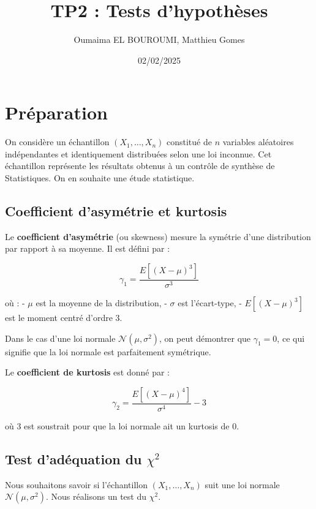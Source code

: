 \documentclass{article}
\title{TP2 : Tests d’hypothèses}
\author{Oumaima EL BOUROUMI, Matthieu Gomes}
\date{02/02/2025}
\begin{document}
\maketitle



\section{Préparation}

On considère un échantillon \( (X_1, \dots, X_n) \) constitué de \( n \) variables aléatoires indépendantes et identiquement distribuées selon une loi inconnue. Cet échantillon représente les résultats obtenus à un contrôle de synthèse de Statistiques. On en souhaite une étude statistique.

\subsection{Coefficient d’asymétrie et kurtosis}

Le \textbf{coefficient d’asymétrie} (ou skewness) mesure la symétrie d’une distribution par rapport à sa moyenne. Il est défini par :

\[
\gamma_1 = \frac{E[(X - \mu)^3]}{\sigma^3}
\]

où :
- \( \mu \) est la moyenne de la distribution,
- \( \sigma \) est l’écart-type,
- \( E[(X - \mu)^3] \) est le moment centré d’ordre 3.

Dans le cas d’une loi normale \( \mathcal{N}(\mu, \sigma^2) \), on peut démontrer que \( \gamma_1 = 0 \), ce qui signifie que la loi normale est parfaitement symétrique.

Le \textbf{coefficient de kurtosis} est donné par :

\[
\gamma_2 = \frac{E[(X - \mu)^4]}{\sigma^4} - 3
\]

où \( 3 \) est soustrait pour que la loi normale ait un kurtosis de 0.

\subsection{Test d’adéquation du \( \chi^2 \)}

Nous souhaitons savoir si l’échantillon \( (X_1, \dots, X_n) \) suit une loi normale \( \mathcal{N}(\mu, \sigma^2) \). Nous réalisons un test du \( \chi^2 \).
\end{document}
